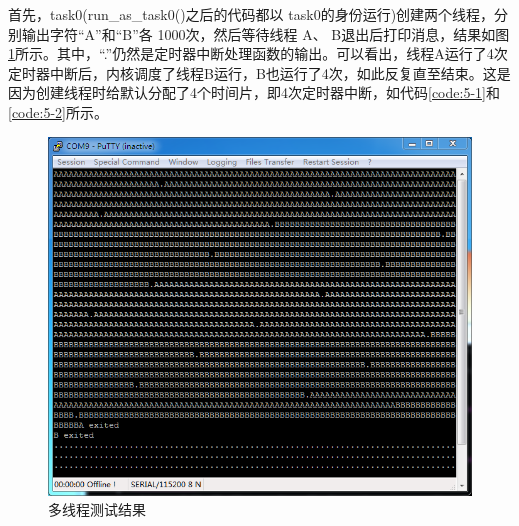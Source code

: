 \documentclass[main.tex]{subfiles}
\begin{document}
\begin{CJK*}{UTF8}{song}
首先，task0(run\_\-as\_\-task0()之后的代码都以 task0的身份运行)创建两个线程，分别输出字符“A”和“B”各 1000次，然后等待线程 A、 B退出后打印消息，结果如图\ref{figure:5-2}所示。其中，“.”仍然是定时器中断处理函数的输出。可以看出，线程A运行了4次定时器中断后，内核调度了线程B运行，B也运行了4次，如此反复直至结束。这是因为创建线程时给默认分配了4个时间片，即4次定时器中断，如代码\ref{code:5-1}和\ref{code:5-2}所示。

\begin{figure}[htp]
\centering
\includegraphics[scale=0.4]{figures/5-2}
\caption{多线程测试结果}
\label{figure:5-2}
\end{figure}


\clearpage
\ifxetex\else\end{CJK*}\fi
\end{document}
